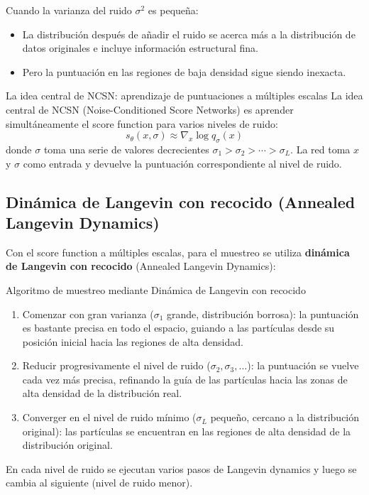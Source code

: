 \documentclass[a4paper]{article}
\begin{document}
Cuando la varianza del ruido $\sigma^2$ es pequeña:
\begin{itemize}
    \item La distribución después de añadir el ruido se acerca más a la distribución de datos originales e incluye información estructural fina.
    \item Pero la puntuación en las regiones de baja densidad sigue siendo inexacta.
\end{itemize}

\begin{importantbox}{La idea central de NCSN: aprendizaje de puntuaciones a múltiples escalas}
La idea central de NCSN (Noise-Conditioned Score Networks) es aprender simultáneamente el score function para varios niveles de ruido:
$$s_\theta(x, \sigma) \approx \nabla_x \log q_\sigma(x)$$
donde $\sigma$ toma una serie de valores decrecientes $\sigma_1 > \sigma_2 > \cdots > \sigma_L$. La red toma $x$ y $\sigma$ como entrada y devuelve la puntuación correspondiente al nivel de ruido.
\end{importantbox}

\subsection{Dinámica de Langevin con recocido (Annealed Langevin Dynamics)}

Con el score function a múltiples escalas, para el muestreo se utiliza \textbf{dinámica de Langevin con recocido} (Annealed Langevin Dynamics):

\begin{importantbox}{Algoritmo de muestreo mediante Dinámica de Langevin con recocido}
\begin{enumerate}
    \item Comenzar con gran varianza ($\sigma_1$ grande, distribución borrosa): la puntuación es bastante precisa en todo el espacio, guiando a las partículas desde su posición inicial hacia las regiones de alta densidad.
    \item Reducir progresivamente el nivel de ruido ($\sigma_2, \sigma_3, \ldots$): la puntuación se vuelve cada vez más precisa, refinando la guía de las partículas hacia las zonas de alta densidad de la distribución real.
    \item Converger en el nivel de ruido mínimo ($\sigma_L$ pequeño, cercano a la distribución original): las partículas se encuentran en las regiones de alta densidad de la distribución original.
\end{enumerate}
En cada nivel de ruido se ejecutan varios pasos de Langevin dynamics y luego se cambia al siguiente (nivel de ruido menor).
\end{importantbox}
\end{document}
